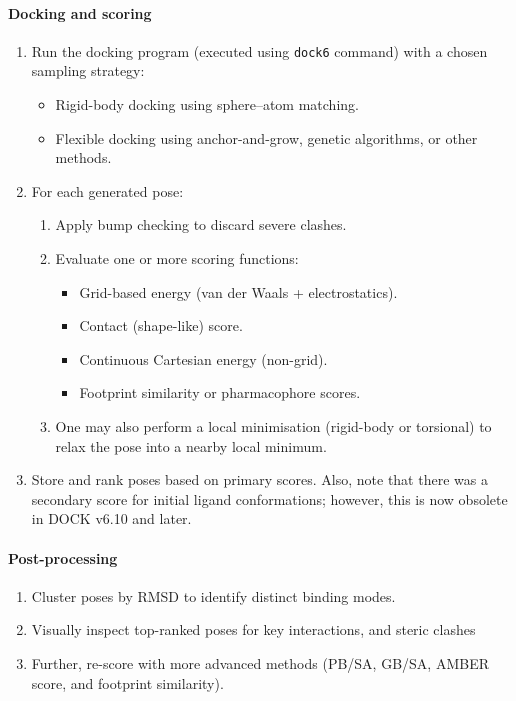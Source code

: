 \documentclass[12pt]{article}
\begin{document}
\paragraph{Docking and scoring}

\begin{enumerate}
  \item Run the docking program (executed using \verb|dock6| command) with a chosen sampling strategy:
        \begin{itemize}
          \item Rigid-body docking using sphere–atom matching.
          \item Flexible docking using anchor-and-grow, genetic algorithms, or other methods.
        \end{itemize}

  \item For each generated pose:
        \begin{enumerate}
          \item Apply bump checking to discard severe clashes.
          \item Evaluate one or more scoring functions:
                \begin{itemize}
                  \item Grid-based energy (van der Waals + electrostatics).
                  \item Contact (shape-like) score.
                  \item Continuous Cartesian energy (non-grid).
                  \item Footprint similarity or pharmacophore scores.
                \end{itemize}

          \item One may also perform a local minimisation (rigid-body or torsional) to relax the pose into a nearby local minimum.
        \end{enumerate}
  \item Store and rank poses based on primary scores. Also, note that there was a secondary score for initial ligand conformations; however, this is now obsolete in DOCK v6.10 and later.
\end{enumerate}

\paragraph{Post-processing}

\begin{enumerate}
  \item Cluster poses by RMSD to identify distinct binding modes.
  \item Visually inspect top-ranked poses for key interactions, and steric clashes
  \item Further, re-score with more advanced methods (PB/SA, GB/SA, AMBER score, and footprint similarity).
\end{enumerate}
\end{document}
